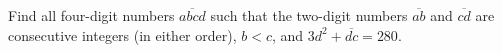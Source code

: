Find all four-digit numbers $\overline{abcd}$ such that the two-digit numbers $\overline{ab}$ and $\overline{cd}$ are consecutive integers (in either order), $b<c$, and $3d^2+\overline{dc}=280$.
